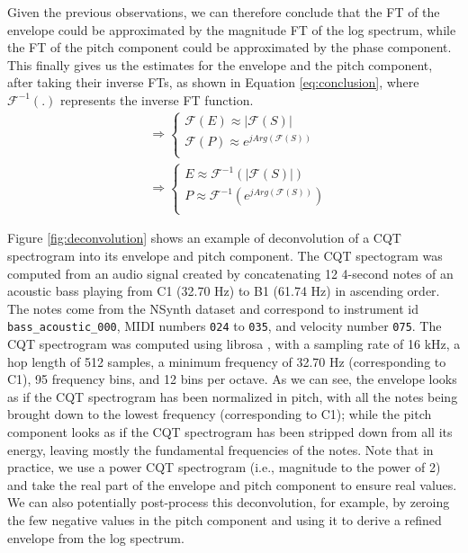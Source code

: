 \documentclass[journal]{IEEEtran}
\begin{document}
Given the previous observations, we can therefore conclude that the FT of the envelope could be approximated by the magnitude FT of the log spectrum, while the FT of the pitch component could be approximated by the phase component. This finally gives us the estimates for the envelope and the pitch component, after taking their inverse FTs, as shown in Equation \ref{eq:conclusion}, where $\mathcal{F}^{-1}(.)$ represents the inverse FT function.
\begin{equation}
\label{eq:conclusion}
\begin{split}
& \Rightarrow 
\begin{cases}
\mathcal{F}(E) \approx |\mathcal{F}(S)| \\
\mathcal{F}(P) \approx e^{j Arg(\mathcal{F}(S))} \\
\end{cases} \\
& \Rightarrow
\begin{cases}
E \approx \mathcal{F}^{-1}(|\mathcal{F}(S)|) \\
P \approx \mathcal{F}^{-1}(e^{j Arg(\mathcal{F}(S))}) \\
\end{cases}
\end{split}
\end{equation}

Figure \ref{fig:deconvolution} shows an example of deconvolution of a CQT spectrogram into its envelope and pitch component. The CQT spectogram was computed from an audio signal created by concatenating 12 4-second notes of an acoustic bass playing from C1 (32.70 Hz) to B1 (61.74 Hz) in ascending order. The notes come from the NSynth dataset \cite{engel2017} and correspond to instrument id \texttt{bass\_acoustic\_000}, MIDI numbers \texttt{024} to \texttt{035}, and velocity number \texttt{075}. The CQT spectrogram was computed using librosa \cite{mcfee2015,schoerkhuber2010}, with a sampling rate of 16 kHz, a hop length of 512 samples, a minimum frequency of 32.70 Hz (corresponding to C1), 95 frequency bins, and 12 bins per octave. As we can see, the envelope looks as if the CQT spectrogram has been normalized in pitch, with all the notes being brought down to the lowest frequency (corresponding to C1); while the pitch component looks as if the CQT spectrogram has been stripped down from all its energy, leaving mostly the fundamental frequencies of the notes. Note that in practice, we use a power CQT spectrogram (i.e., magnitude to the power of 2) and take the real part of the envelope and pitch component to ensure real values. We can also potentially post-process this deconvolution, for example, by zeroing the few negative values in the pitch component and using it to derive a refined  envelope from the log spectrum.
\end{document}
